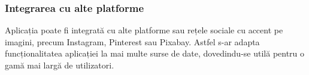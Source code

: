 \subsubsection{Integrarea cu alte platforme}
Aplicația poate fi integrată cu alte platforme sau rețele sociale cu accent pe imagini, precum Instagram, Pinterest sau Pixabay. Astfel s-ar adapta funcționalitatea aplicației la mai multe surse de date, dovedindu-se utilă pentru o gamă mai largă de utilizatori.